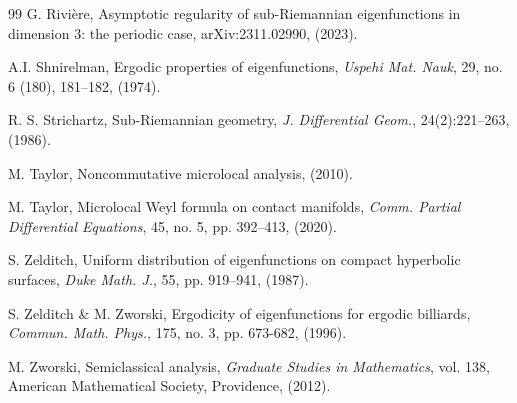 \documentclass[12pt,a4paper]{amsart}
\theoremstyle{plain}
\theoremstyle{definition}
\theoremstyle{remark}
\numberwithin{equation}{section}
\theoremstyle{definition}
\numberwithin{equation}{section}
\begin{document}
\begin{thebibliography}{99}
 G. Rivière, Asymptotic regularity of sub-Riemannian eigenfunctions in dimension 3: the periodic case, arXiv:2311.02990, (2023).

 A.I. Shnirelman, Ergodic properties of eigenfunctions, {\it Uspehi Mat. Nauk}, 29, no. 6 (180), 181–182, (1974).

 R. S. Strichartz, Sub-Riemannian geometry, {\it J. Differential Geom.}, 24(2):221–263, (1986).

 M. Taylor, {Noncommutative microlocal analysis}, (2010).

 M. Taylor, Microlocal Weyl formula on contact manifolds, {\it Comm. Partial Differential Equations}, 45, no. 5, pp. 392–413, (2020).

 S. Zelditch, Uniform distribution of eigenfunctions on compact hyperbolic surfaces, {\it Duke Math. J.}, 55, pp. 919–941, (1987).

 S. Zelditch \& M. Zworski, Ergodicity of eigenfunctions for ergodic billiards, {\it Commun. Math. Phys.}, 175, no. 3, pp. 673-682, (1996).


 M. Zworski, Semiclassical analysis, {\it Graduate Studies in Mathematics}, vol. 138, American Mathematical Society, Providence, (2012).

\end{thebibliography}
\end{document}

